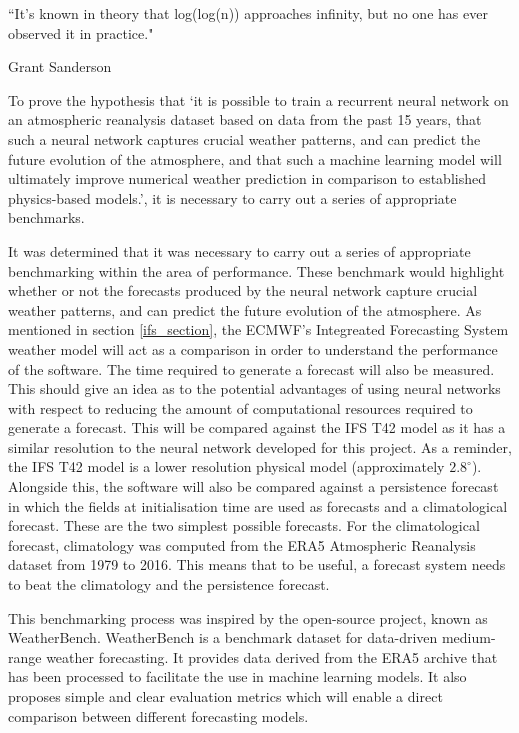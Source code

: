 \epigraph{``It's known in theory that log(log(n)) approaches infinity, but no one has ever observed it in practice."}{Grant Sanderson}

To prove the hypothesis that `it is possible to train a recurrent neural network on an atmospheric reanalysis dataset based on data from the past 15 years, that such a neural network captures crucial weather patterns, and can predict the future evolution of the atmosphere, and that such a machine learning model will ultimately improve numerical weather prediction in comparison to established physics-based models.', it is necessary to carry out a series of appropriate benchmarks.

It was determined that it was necessary to carry out a series of appropriate benchmarking within the area of performance. These benchmark would highlight whether or not the forecasts produced by the neural network capture crucial weather patterns, and can predict the future evolution of the atmosphere. As mentioned in section \ref{ifs_section}, the ECMWF's Integreated Forecasting System weather model will act as a comparison in order to understand the performance of the software. The time required to generate a forecast will also be measured. This should give an idea as to the potential advantages of using neural networks with respect to reducing the amount of computational resources required to generate a forecast. This will be compared against the IFS T42 model as it has a similar resolution to the neural network developed for this project. As a reminder, the IFS T42 model is a lower resolution physical model (approximately $2.8^{\circ}$).  Alongside this, the software will also be compared against a persistence forecast in which the fields at initialisation time are used as forecasts and a climatological forecast. These are the two simplest possible forecasts. For the climatological forecast, climatology was computed from the ERA5 Atmospheric Reanalysis dataset from 1979 to 2016. This means that to be useful, a forecast system needs to beat the climatology and the persistence forecast.

This benchmarking process was inspired by the open-source project, known as WeatherBench. WeatherBench is a benchmark dataset for data-driven medium-range weather forecasting. It provides data derived from the ERA5 archive that has been processed to facilitate the use in machine learning models. It also proposes simple and clear evaluation metrics which will enable a direct comparison between different forecasting models\cite{rasp2020weatherbench}. 

